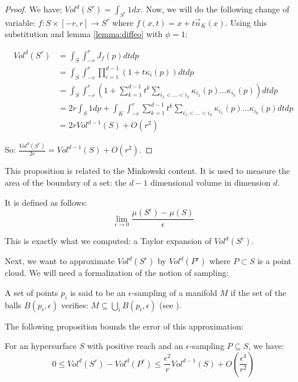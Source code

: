 \begin{proof}
    We have: $ Vol^d(S^r) = \int_{S^r} 1 dx $. Now, we will do the following
    change of variable: $ f : S \times [-r, r] \rightarrow S^r $ where $ f(x, t)
    = x + t \vec{n}_K(x) $. Using this substitution and lemma \ref{lemma:diffeo}
    with $ \phi = 1 $:

    \begin{align*}
        Vol^d(S^r) &= \int_S \int_{-r}^r J_f(p) dt dp \\
        &= \int_S \int_{-r}^r \prod_{i=1}^{d-1} (1 + t \kappa_i(p)) dt dp \\
        &= \int_S \int_{-r}^r \left( 1 + \sum_{k=1}^{d-1} t^k \sum_{i_1 < \ldots
                < i_k} \kappa_{i_1}(p) \ldots \kappa_{i_k}(p) \right) dt dp \\
        &= 2r \int_S 1 dp + \int_K \int_{-r}^r \sum_{k=1}^{d-1} t^k \sum_{i_1 < \ldots < i_k} \kappa_{i_1}(p) \ldots \kappa_{i_k}(p) dt dp \\
        &= 2r Vol^{d-1}(S) + O(r^2)
    \end{align*}

    So: $ \frac{Vol^d(S^r)}{2r} = Vol^{d-1}(S) + O(r^2) $.
\end{proof}

This proposition is related to the Minkowski content. It is used to measure the
area of the boundary of a set: the $ d-1 $ dimensional volume in dimension $ d
$.

It is defined as follows:
$$ \lim\limits_{\epsilon \to 0} \frac{\mu(S^{\epsilon}) - \mu(S)}{\epsilon} $$

This is exactly what we computed: a Taylor expansion of $ Vol^d(S^r) $.

Next, we want to approximate $ Vol^d(S^r) $ by $ Vol^d(P^r) $ where $ P \subset
S $ is a point cloud. We will need a formalization of the notion of sampling:

\begin{definition}
    A set of points $ p_i $ is said to be an $\epsilon$-sampling of a manifold $
    M $ if the set of the balls  $ B(p_i, \epsilon) $ verifies: $ M \subseteq
    \bigcup_i B(p_i, \epsilon) $ (see \cite{amenta1999surface}).
\end{definition}

The following proposition bounds the error of this approximation:

\begin{proposition}
    \label{prop:comp-vol-offsets}
    For an hypersurface $ S $ with positive reach and an $\epsilon$-sampling $ P
    \subseteq S $, we have:
    $$ 0 \leq Vol^d(S^r) - Vol^d(P^r) \leq \frac{\epsilon^2}{r} Vol^{d-1}(S) +
    O(\frac{\epsilon^4}{r^2}) $$
\end{proposition}

